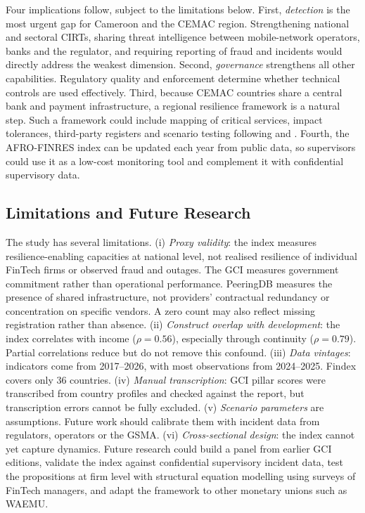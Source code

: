 \documentclass[11pt,a4paper]{article}
\begin{document}
Four implications follow, subject to the limitations below. First, \emph{detection} is the most urgent gap for Cameroon and the CEMAC region. Strengthening national and sectoral CIRTs, sharing threat intelligence between mobile-network operators, banks and the regulator, and requiring reporting of fraud and incidents would directly address the weakest dimension. Second, \emph{governance} strengthens all other capabilities. Regulatory quality and enforcement determine whether technical controls are used effectively. Third, because CEMAC countries share a central bank and payment infrastructure, a regional resilience framework is a natural step. Such a framework could include mapping of critical services, impact tolerances, third-party registers and scenario testing following \citet{BCBS2021} and \citet{FSB2023}. Fourth, the AFRO-FINRES index can be updated each year from public data, so supervisors could use it as a low-cost monitoring tool and complement it with confidential supervisory data.

\subsection{Limitations and Future Research}

The study has several limitations. (i) \emph{Proxy validity}: the index measures resilience-enabling capacities at national level, not realised resilience of individual FinTech firms or observed fraud and outages. The GCI measures government commitment rather than operational performance. PeeringDB measures the presence of shared infrastructure, not providers' contractual redundancy or concentration on specific vendors. A zero count may also reflect missing registration rather than absence. (ii) \emph{Construct overlap with development}: the index correlates with income ($\rho=0.56$), especially through continuity ($\rho=0.79$). Partial correlations reduce but do not remove this confound. (iii) \emph{Data vintages}: indicators come from 2017--2026, with most observations from 2024--2025. Findex covers only 36 countries. (iv) \emph{Manual transcription}: GCI pillar scores were transcribed from country profiles and checked against the report, but transcription errors cannot be fully excluded. (v) \emph{Scenario parameters} are assumptions. Future work should calibrate them with incident data from regulators, operators or the GSMA. (vi) \emph{Cross-sectional design}: the index cannot yet capture dynamics. Future research could build a panel from earlier GCI editions, validate the index against confidential supervisory incident data, test the propositions at firm level with structural equation modelling using surveys of FinTech managers, and adapt the framework to other monetary unions such as WAEMU.
\end{document}

